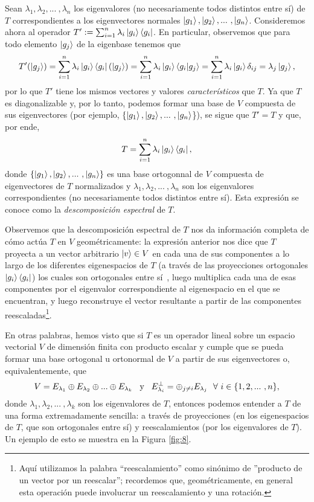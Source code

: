 \documentclass[12pt,dvipsnames]{article}
\begin{document}
\vspace{3mm}
Sean $\lambda_1,\lambda_2,... \ ,\lambda_n$ los eigenvalores (no necesariamente todos distintos entre sí) de $T$ correspondientes a los eigenvectores normales $\ket{g_1},\ket{g_2},... \ ,\ket{g_n}$. Consideremos ahora al operador $T':=\sum_{i=1}^n \lambda_i \ket{g_i}\bra{g_i}$. En particular, observemos que para todo elemento $\ket{g_j}$ de la eigenbase tenemos que \[
    T'(\ket{g_j})=\sum_{i=1}^n \lambda_i \ket{g_i}\bra{g_i}(\ket{g_j})=\sum_{i=1}^n \lambda_i \ket{g_i}\braket{g_i|g_j}=\sum_{i=1}^n \lambda_i \ket{g_i}\delta_{ij}=\lambda_j \ket{g_j},
\] por lo que $T'$ tiene los mismos vectores y valores \emph{característicos} que $T$.  Ya que $T$ es diagonalizable y, por lo tanto, podemos formar una base de $V$ compuesta de sus eigenvectores (por ejemplo, $\{\ket{g_1},\ket{g_2},... \ ,\ket{g_n}$\}), se sigue que $T'=T$ y que, por ende, \[
T = \sum_{i=1}^n \lambda_i \ket{g_i}\bra{g_i},
\] donde $\{\ket{g_1},\ket{g_2},... \ ,\ket{g_n}\}$ es una base ortogonnal de $V$ compuesta de eigenvectores de $T$ normalizados y $\lambda_1,\lambda_2,... \ ,\lambda_n$ son los eigenvalores correspondientes (no necesariamente todos distintos entre sí). Esta expresión se conoce como la \emph{descomposición espectral} de $T$.

\vspace{3mm}
Observemos que la descomposición espectral de $T$ nos da información completa de cómo actúa $T$ en $V$ geométricamente: la expresión anterior nos dice que $T$ proyecta a un vector arbitrario $\ket{v}\in V$ en cada una de sus componentes a lo largo de los diferentes eigenespacios de $T$ (a través de las proyecciones ortogonales $\ket{g_i}\bra{g_i}$) \textemdash los cuales son ortogonales entre sí\textemdash \ , luego multiplica cada una de esas componentes por el eigenvalor correspondiente al eigenespacio en el que se encuentran, y luego reconstruye el vector resultante a partir de las componentes reescaladas\footnote{Aquí utilizamos la palabra ``reescalamiento'' como sinónimo de ''producto de un vector por un reescalar''; recordemos que, geométricamente, en general esta operación puede involucrar un reescalamiento y una rotación.}.

\vspace{3mm}
En otras palabras, hemos visto que si $T$ es un operador lineal sobre un espacio vectorial $V$ de dimensión finita con producto escalar y cumple que se pueda formar una base ortogonal u ortonormal de $V$ a partir de sus eigenvectores o, equivalentemente, que $$V=E_{\lambda_1}\oplus E_{\lambda_2}\oplus...\oplus E_{\lambda_k}\hspace{3mm}\text{y}\hspace{3mm}E_{\lambda_i}^\perp=\oplus_{j\neq i}E_{\lambda_j} \ \ \forall \ i\in \{1,2,... \ ,n\},$$ donde $\lambda_1, \lambda_2, ... \ , \lambda_k$ son los eigenvalores de $T$, entonces podemos entender a $T$ de una forma extremadamente sencilla: a través de proyecciones (en los eigenespacios de $T$, que son ortogonales entre sí) y reescalamientos (por los eigenvalores de $T$). Un ejemplo de esto se muestra en la Figura \ref{fig:8}.
\end{document}
